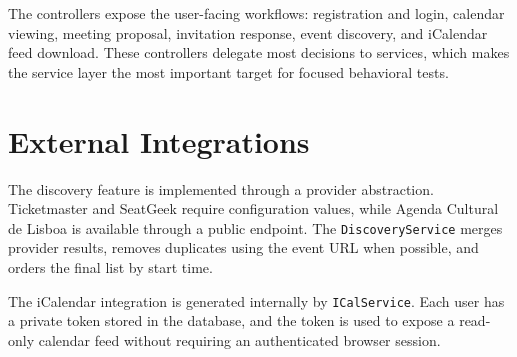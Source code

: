 The controllers expose the user-facing workflows: registration and login, calendar viewing, meeting proposal, invitation response, event discovery, and iCalendar feed download. These controllers delegate most decisions to services, which makes the service layer the most important target for focused behavioral tests.

\section{External Integrations}

The discovery feature is implemented through a provider abstraction. Ticketmaster and SeatGeek require configuration values, while Agenda Cultural de Lisboa is available through a public endpoint. The \texttt{DiscoveryService} merges provider results, removes duplicates using the event URL when possible, and orders the final list by start time.

The iCalendar integration is generated internally by \texttt{ICalService}. Each user has a private token stored in the database, and the token is used to expose a read-only calendar feed without requiring an authenticated browser session.
